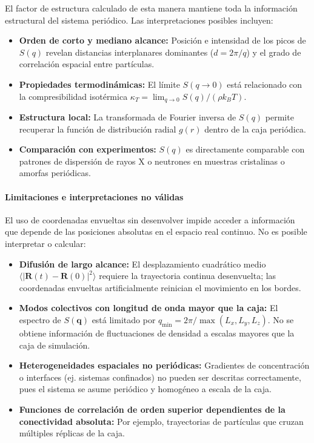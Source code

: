 \documentclass{tufte-handout}
\begin{document}
El factor de estructura calculado de esta manera mantiene toda la información estructural del sistema periódico. Las interpretaciones posibles incluyen:
\begin{itemize}
    \item \textbf{Orden de corto y mediano alcance:} Posición e intensidad de los picos de $S(q)$ revelan distancias interplanares dominantes ($d = 2\pi/q$) y el grado de correlación espacial entre partículas.
    \item \textbf{Propiedades termodinámicas:} El límite $S(q\to 0)$ está relacionado con la compresibilidad isotérmica $\kappa_T = \lim_{q\to 0} S(q) / (\rho k_B T)$.
    \item \textbf{Estructura local:} La transformada de Fourier inversa de $S(q)$ permite recuperar la función de distribución radial $g(r)$ dentro de la caja periódica.
    \item \textbf{Comparación con experimentos:} $S(q)$ es directamente comparable con patrones de dispersión de rayos X o neutrones en muestras cristalinas o amorfas periódicas.
\end{itemize}

\paragraph*{Limitaciones e interpretaciones no válidas}

El uso de coordenadas envueltas sin desenvolver impide acceder a información que depende de las posiciones absolutas en el espacio real continuo. No es posible interpretar o calcular:
\begin{itemize}
    \item \textbf{Difusión de largo alcance:} El desplazamiento cuadrático medio $\langle |\mathbf{R}(t) - \mathbf{R}(0)|^2 \rangle$ requiere la trayectoria continua desenvuelta; las coordenadas envueltas artificialmente reinician el movimiento en los bordes.
    \item \textbf{Modos colectivos con longitud de onda mayor que la caja:} El espectro de $S(\mathbf{q})$ está limitado por $q_{\text{min}} = 2\pi/\max(L_x,L_y,L_z)$. No se obtiene información de fluctuaciones de densidad a escalas mayores que la caja de simulación.
    \item \textbf{Heterogeneidades espaciales no periódicas:} Gradientes de concentración o interfaces (ej. sistemas confinados) no pueden ser descritas correctamente, pues el sistema se asume periódico y homogéneo a escala de la caja.
    \item \textbf{Funciones de correlación de orden superior dependientes de la conectividad absoluta:} Por ejemplo, trayectorias de partículas que cruzan múltiples réplicas de la caja.
\end{itemize}
\end{document}
